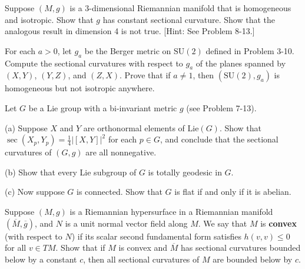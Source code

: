 \begin{exercise}
\label{prob:homogeneous-isotropic-3-manifold}
Suppose $(M, g)$ is a 3-dimensional Riemannian manifold that is homogeneous and isotropic. Show that $g$ has constant sectional curvature. Show that the analogous result in dimension 4 is not true. [Hint: See Problem 8-13.]
\end{exercise}

\begin{exercise}
\label{prob:berger-metric-su2}
For each $a > 0$, let $g_a$ be the Berger metric on $\text{SU}(2)$ defined in Problem 3-10. Compute the sectional curvatures with respect to $g_a$ of the planes spanned by $(X, Y)$, $(Y, Z)$, and $(Z, X)$. Prove that if $a \neq 1$, then $(\text{SU}(2), g_a)$ is homogeneous but not isotropic anywhere.
\end{exercise}

\begin{exercise}
\label{prob:lie-group-bi-invariant-metric-ch8}
Let $G$ be a Lie group with a bi-invariant metric $g$ (see Problem 7-13).

(a) Suppose $X$ and $Y$ are orthonormal elements of $\text{Lie}(G)$. Show that $\sec(X_p, Y_p) = \frac{1}{4}|[X, Y]|^2$ for each $p \in G$, and conclude that the sectional curvatures of $(G, g)$ are all nonnegative.

(b) Show that every Lie subgroup of $G$ is totally geodesic in $G$.

(c) Now suppose $G$ is connected. Show that $G$ is flat if and only if it is abelian.
\end{exercise}

\begin{exercise}
\label{prob:convex-hypersurface}
Suppose $(M, g)$ is a Riemannian hypersurface in a Riemannian manifold $(\overline{M}, \overline{g})$, and $N$ is a unit normal vector field along $M$. We say that $M$ is \textbf{convex} (with respect to $N$) if its scalar second fundamental form satisfies $h(v, v) \leq 0$ for all $v \in TM$. Show that if $M$ is convex and $\overline{M}$ has sectional curvatures bounded below by a constant $c$, then all sectional curvatures of $M$ are bounded below by $c$.
\end{exercise}

